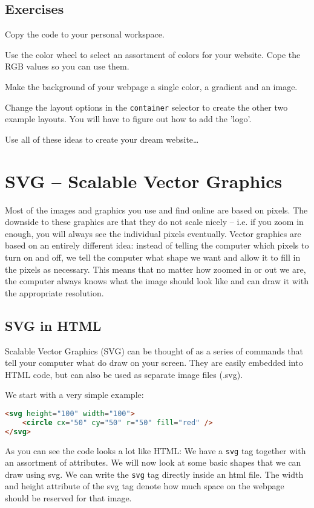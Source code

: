 \documentclass[11pt,a4paper]{report}
\begin{document}
\subsection{Exercises}
\begin{ex}
Copy the code to your personal workspace. 
\end{ex}
\begin{ex}
Use the color wheel to select an assortment of colors for your website. Cope the RGB values so you can use them.
\end{ex}
\begin{ex}
Make the background of your webpage a single color, a gradient and an image.
\end{ex}
\begin{ex}
Change the layout options in the \verb|container| selector to create the other two example layouts. You will have to figure out how to add the 'logo'.
\end{ex}

\begin{ex}
Use all of these ideas to create your dream website\ldots
\end{ex}


\newpage
\section{SVG -- Scalable Vector Graphics}

Most of the images  and graphics you use and find online are based on pixels. The downside to these graphics are that they do not scale nicely -- i.e. if you zoom in enough, you will always see the individual pixels eventually. Vector graphics are based on an entirely different idea: instead of telling the computer which pixels to turn on and off, we tell the computer what shape we want and allow it to fill in the pixels as necessary. This means that no matter how zoomed in or out we are, the computer always knows what the image should look like and can draw it with the appropriate resolution.

\subsection{SVG in HTML}
Scalable Vector Graphics (SVG) can be thought of as a series of commands that tell your computer what do draw on your screen. They are easily embedded into HTML code, but can also be used as separate image files (.svg).



We start with a very simple example: 
\begin{lstlisting}[language=html]
<svg height="100" width="100">
    <circle cx="50" cy="50" r="50" fill="red" />
</svg>
\end{lstlisting}
As you can see the code looks a lot like HTML: We  have a \verb|svg| tag together with an assortment of attributes. We will now look at some basic shapes that we can draw using svg. We can write the \verb|svg| tag directly inside an html file. The width and height attribute of the svg tag denote how much space on the webpage should be reserved for that image.
\end{document}
